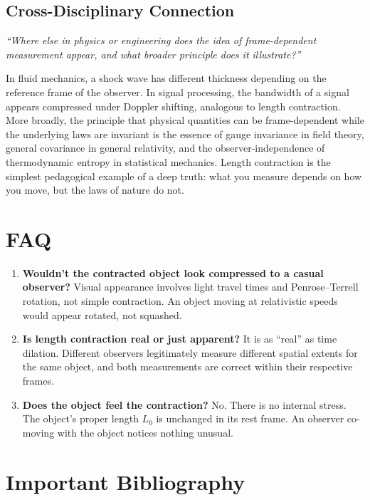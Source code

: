 \documentclass[11pt,openright]{book}
\begin{document}
\subsection*{Cross-Disciplinary Connection}
\textit{``Where else in physics or engineering does the idea of frame-dependent measurement appear, and what broader principle does it illustrate?''}

In fluid mechanics, a shock wave has different thickness depending on the reference frame of the observer. In signal processing, the bandwidth of a signal appears compressed under Doppler shifting, analogous to length contraction. More broadly, the principle that physical quantities can be frame-dependent while the underlying laws are invariant is the essence of gauge invariance in field theory, general covariance in general relativity, and the observer-independence of thermodynamic entropy in statistical mechanics. Length contraction is the simplest pedagogical example of a deep truth: what you measure depends on how you move, but the laws of nature do not.

\section*{FAQ}

\begin{enumerate}
\item \textbf{Wouldn't the contracted object look compressed to a casual observer?}
Visual appearance involves light travel times and Penrose--Terrell rotation, not simple contraction. An object moving at relativistic speeds would appear rotated, not squashed.

\item \textbf{Is length contraction real or just apparent?}
It is as ``real'' as time dilation. Different observers legitimately measure different spatial extents for the same object, and both measurements are correct within their respective frames.

\item \textbf{Does the object feel the contraction?}
No. There is no internal stress. The object's proper length $L_{0}$ is unchanged in its rest frame. An observer co-moving with the object notices nothing unusual.
\end{enumerate}
\section*{Important Bibliography}
\end{document}
